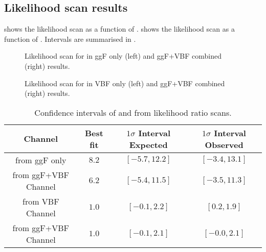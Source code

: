 \FloatBarrier
\clearpage

\subsection{Likelihood scan results}
\Fig{\ref{fig:ggf_vbf-kl-likelihood-corr-obs}} shows the likelihood scan as a function of \kl.
\Fig{\ref{fig:ggf_vbf-kvv-likelihood-corr-obs}} shows the likelihood scan as a function of \kvv.
Intervals are summarised in \Tab{\ref{table:kl-kvv-likelihood-tab}}.

\begin{figure}[htp]
\centering
	\caption{Likelihood scan for \kl in ggF only (left) and ggF+VBF combined (right) results.}
	\label{fig:ggf_vbf-kl-likelihood-corr-obs}
\end{figure}

\begin{figure}[htp]
\centering
	\caption{Likelihood scan for \kvv in VBF only (left) and ggF+VBF combined (right) results.}
	\label{fig:ggf_vbf-kvv-likelihood-corr-obs}
\end{figure}

\begin{table}[h]
	\centering
	\caption{Confidence intervals of \kl and \kvv from likelihood ratio scans.}
	\begin{tabular}{c c c c}
		\toprule
		{Channel} & {Best fit} & {$1\sigma$ Interval Expected} & {$1\sigma$ Interval Observed} \\
		\midrule
		{\kl from ggF only}  & {$8.2$} & {$[-5.7, 12.2]$} & {$[-3.4, 13.1]$} \\
		{\kl from ggF+VBF Channel} & {$6.2$} & {$[-5.4, 11.5]$} & {$[-3.5, 11.3]$} \\
		{\kvv from VBF Channel} & {$1.0$} & {$[-0.1, 2.2]$} & {$[0.2, 1.9]$} \\
		{\kvv from ggF+VBF Channel} & {$1.0$} & {$[-0.1, 2.1]$} & {$[-0.0, 2.1]$} \\
		\bottomrule
	\end{tabular}
\label{table:kl-kvv-likelihood-tab}
\end{table}


